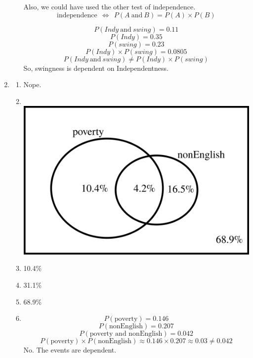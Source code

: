 \documentclass[12pt,letterpaper]{article}
\begin{document}
\begin{enumerate}
\begin{enumerate}
Also, we could have used the other test of independence.
$$\text{independence} ~~\iff~~ P(A~\text{and}~B) = P(A)\times P(B)$$

$$P(Indy~\text{and}~swing) = 0.11$$
$$P(Indy) = 0.35$$
$$P(swing) = 0.23$$
$$P(Indy)\times P(swing) = 0.0805 $$
$$P(Indy~\text{and}~swing) \ne P(Indy)\times P(swing)$$
So, swingness is dependent on Independentness.
\end{enumerate}

\item \begin{enumerate}
\item Nope.
\item ~\\ \includegraphics[scale=0.4]{figures/venn3.png}
\item 10.4\%
\item 31.1\%
\item 68.9\%
\item $$P(\text{poverty}) = 0.146$$
$$P(\text{nonEnglish}) = 0.207$$
$$P(\text{poverty and nonEnglish}) = 0.042$$
$$P(\text{poverty}) \times P(\text{nonEnglish}) \approx 0.146\times 0.207 \approx 0.03 \ne 0.042 $$
No. The events are dependent.
\end{enumerate}

\end{enumerate}
\end{document}
